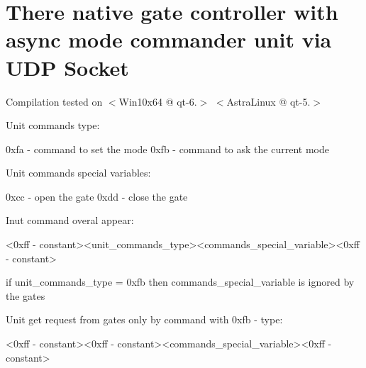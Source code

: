 \chapter{There native gate controller with async mode commander unit via UDP Socket}
\hypertarget{md_readme}{}\label{md_readme}
\label{md_readme_autotoc_md0}%
%


Compilation tested on \texorpdfstring{$<$}{<}Win10x64 @ qt-\/6.\texorpdfstring{$>$}{>} \texorpdfstring{$<$}{<}Astra\+Linux @ qt-\/5.\texorpdfstring{$>$}{>}

Unit commands type\+: \begin{DoxyVerb}0xfa - command to set the mode
0xfb - command to ask the current mode
\end{DoxyVerb}


Unit commands special variables\+: \begin{DoxyVerb}0xcc - open the gate
0xdd - close the gate
\end{DoxyVerb}


Inut command overal appear\+: \begin{DoxyVerb}<0xff - constant><unit_commands_type><commands_special_variable><0xff - constant>
\end{DoxyVerb}
 if unit\+\_\+commands\+\_\+type = 0xfb then commands\+\_\+special\+\_\+variable is ignored by the gates

Unit get request from gates only by command with 0xfb -\/ type\+: \begin{DoxyVerb}<0xff - constant><0xff - constant><commands_special_variable><0xff - constant>
\end{DoxyVerb}
 